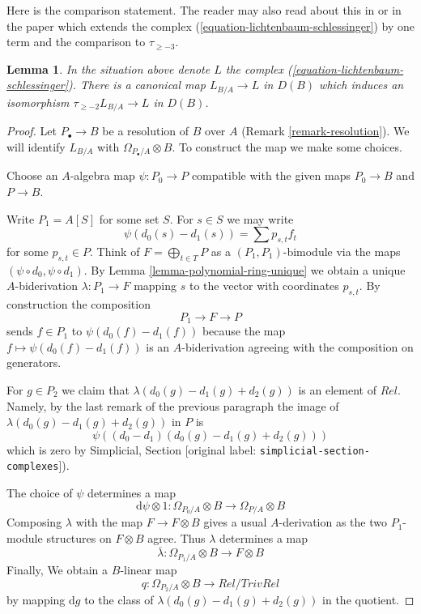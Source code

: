 \documentclass[10pt,a4paper]{article}
\theoremstyle{plain}
\newtheorem{lemma}[subsection]{Lemma}
\theoremstyle{definition}
\theoremstyle{remark}
\numberwithin{equation}{subsection}
\begin{document}
\noindent
Here is the comparison statement. The reader may also read about this
in \cite[page 206, Proposition 12]{Andre-Homologie} or in the paper
\cite{Doncel} which extends the complex
(\ref{equation-lichtenbaum-schlessinger}) by one term and the comparison
to $\tau_{\geq -3}$.


\begin{lemma}
\label{lemma-compare-higher}
In the situation above denote $L$ the complex
(\ref{equation-lichtenbaum-schlessinger}).
There is a canonical map $L_{B/A} \to L$ in $D(B)$ which
induces an isomorphism $\tau_{\geq -2}L_{B/A} \to L$ in $D(B)$.
\end{lemma}



\begin{proof}
Let $P_\bullet \to B$ be a resolution of $B$ over $A$
(Remark \ref{remark-resolution}). We will identify $L_{B/A}$ with
$\Omega_{P_\bullet/A} \otimes B$. To construct the map we
make some choices.

\medskip\noindent
Choose an $A$-algebra map $\psi : P_0 \to P$ compatible with the
given maps $P_0 \to B$ and $P \to B$.

\medskip\noindent
Write $P_1 = A[S]$ for some set $S$. For $s \in S$ we may write
$$
\psi(d_0(s) - d_1(s)) = \sum p_{s, t} f_t
$$
for some $p_{s, t} \in P$. Think of $F = \bigoplus_{t \in T} P$
as a $(P_1, P_1)$-bimodule via the maps $(\psi \circ d_0, \psi \circ d_1)$.
By Lemma \ref{lemma-polynomial-ring-unique} we obtain a unique
$A$-biderivation $\lambda : P_1 \to F$ mapping $s$ to the vector with
coordinates $p_{s, t}$. By construction the composition
$$
P_1 \longrightarrow F \longrightarrow P
$$
sends $f \in P_1$ to $\psi(d_0(f) - d_1(f))$ because the map
$f \mapsto \psi(d_0(f) - d_1(f))$ is an $A$-biderivation agreeing with
the composition on generators.

\medskip\noindent
For $g \in P_2$ we claim that $\lambda(d_0(g) - d_1(g) + d_2(g))$
is an element of $Rel$. Namely, by the last remark of the previous
paragraph the image of $\lambda(d_0(g) - d_1(g) + d_2(g))$ in $P$ is
$$
\psi((d_0 - d_1)(d_0(g) - d_1(g) + d_2(g)))
$$
which is zero by Simplicial, Section \textnormal{[original label: \nolinkurl{simplicial-section-complexes}]}).

\medskip\noindent
The choice of $\psi$ determines a map
$$
\text{d}\psi \otimes 1 :
\Omega_{P_0/A} \otimes B
\longrightarrow
\Omega_{P/A} \otimes B
$$
Composing $\lambda$ with the map $F \to F \otimes B$ gives a
usual $A$-derivation as the two $P_1$-module structures on
$F \otimes B$ agree. Thus $\lambda$ determines a map
$$
\overline{\lambda} :
\Omega_{P_1/A} \otimes B
\longrightarrow
F \otimes B
$$
Finally, We obtain a $B$-linear map
$$
q :
\Omega_{P_2/A} \otimes B
\longrightarrow
Rel/TrivRel
$$
by mapping $\text{d}g$ to the class of $\lambda(d_0(g) - d_1(g) + d_2(g))$
in the quotient.


\end{proof}
\end{document}
